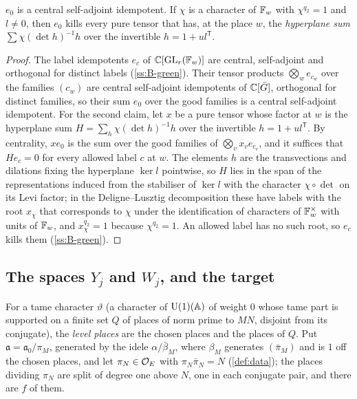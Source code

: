\begin{proposition}\label{prop:e0}
$e_0$ is a central self-adjoint idempotent. If $\chi$ is a character of $\mathbb{F}_w$ with $\chi^{q_2}=1$ and $l\ne0$,
then $e_0$ kills every pure tensor that has, at the place $w$, the \emph{hyperplane sum}
$\sum\chi(\det h)^{-1}h$ over the invertible $h=1+ul^{\mathsf T}$.
\end{proposition}

\begin{proof}
The label idempotents $e_c$ of $\mathbb{C}[\operatorname{GL}_r(\mathbb{F}_w)]$ are central, self-adjoint and orthogonal for distinct labels (\cref{ss:B-green}). Their tensor products $\bigotimes_we_{c_w}$ over the families $(c_w)$ are central self-adjoint idempotents of $\mathbb{C}[\bar G]$, orthogonal for distinct families, so their sum $e_0$ over the good families is a
central self-adjoint idempotent. For the second claim, let $x$ be a pure tensor whose factor at $w$ is the hyperplane sum $H=\sum_h\chi(\det h)^{-1}h$ over the invertible $h=1+ul^{\mathsf T}$. By centrality, $xe_0$ is the sum over the good families of $\bigotimes_vx_ve_{c_v}$, and it suffices that $He_c=0$ for every allowed label $c$ at
$w$. The elements $h$ are the transvections and dilations fixing the hyperplane $\ker l$ pointwise, so $H$ lies in the span of the representations induced from the stabiliser of $\ker l$ with the character $\chi\circ\det$ on its Levi factor; in the Deligne--Lusztig decomposition these have labels with the root
$x_\chi$ that corresponds to $\chi$ under the identification of characters of $\mathbb{F}_w^\times$ with units of $\mathbb{F}_w$, and $x_\chi^{q_2}=1$ because $\chi^{q_2}=1$. An allowed label has no such root, so $e_c$ kills them (\cref{ss:B-green}).
\end{proof}

\subsection{The spaces \texorpdfstring{$Y_j$}{Yj} and \texorpdfstring{$W_j$}{Wj}, and the target}\label{ss:spaces-Y}
For a tame character $\vartheta$ (a character of $\operatorname{U}(1)(\mathbb{A})$ of weight $0$ whose tame part is supported on
a finite set $Q$ of places of norm prime to $MN$, disjoint from its conjugate), the \emph{level places}
are the chosen places and the places of $Q$. Put $\mathfrak a=\mathfrak a_0/\pi_M$, generated by the idele
$\alpha/\bar\beta_M$, where $\beta_M$ generates $(\bar\pi_M)$ and is $1$ off the chosen places, and let
$\pi_N\in\mathcal{O}_E$ with $\pi_N\bar\pi_N=N$ (\cref{def:data}); the places dividing $\pi_N$ are split of
degree one above $N$, one in each conjugate pair, and there are $f$ of them.

